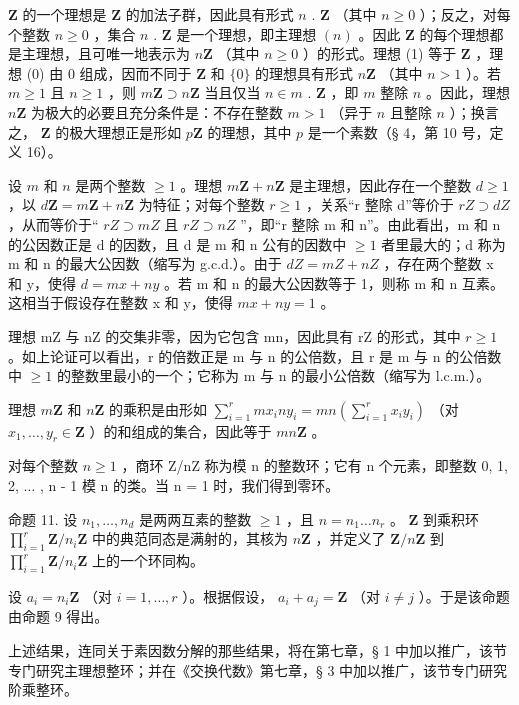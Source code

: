 
\(\mathbf{Z}\) 的一个理想是 \(\mathbf{Z}\) 的加法子群，因此具有形式 \(n\) . \(\mathbf{Z}\) （其中 \(n \geqslant 0\) ）；反之，对每个整数 \(n \geqslant 0\) ，集合 \(n\) . \(\mathbf{Z}\) 是一个理想，即主理想 \((n)\) 。因此 \(\mathbf{Z}\) 的每个理想都是主理想，且可唯一地表示为 \(n\mathbf{Z}\) （其中 \(n \geqslant 0\) ）的形式。理想 (1) 等于 \(\mathbf{Z}\) ，理想 (0) 由 0 组成，因而不同于 \(\mathbf{Z}\) 和 \(\{0\}\) 的理想具有形式 \(n\mathbf{Z}\) （其中 \(n > 1\) ）。若 \(m \geqslant 1\) 且 \(n \geqslant 1\) ，则 \(m\mathbf{Z} \supset n\mathbf{Z}\) 当且仅当 \(n \in m\) . \(\mathbf{Z}\) ，即 \(m\) 整除 \(n\) 。因此，理想 \(n\mathbf{Z}\) 为极大的必要且充分条件是：不存在整数 \(m > 1\) （异于 \(n\) 且整除 \(n\) ）；换言之， \(\mathbf{Z}\) 的极大理想正是形如 \(p\mathbf{Z}\) 的理想，其中 \(p\) 是一个素数（§ 4，第 10 号，定义 16）。

设 \(m\) 和 \(n\) 是两个整数 \(\geqslant 1\) 。理想 \(m\mathbf{Z} + n\mathbf{Z}\) 是主理想，因此存在一个整数 \(d \geqslant 1\) ，以 \(d\mathbf{Z} = m\mathbf{Z} + n\mathbf{Z}\) 为特征；对每个整数 \(r \geqslant 1\) ，关系“r 整除 d”等价于 \(rZ \supset dZ\) ，从而等价于“ \(rZ \supset mZ\) 且 \(rZ \supset nZ\) ”，即“r 整除 m 和 n”。由此看出，m 和 n 的公因数正是 d 的因数，且 d 是 m 和 n 公有的因数中 \(\geqslant 1\) 者里最大的；d 称为 m 和 n 的最大公因数（缩写为 g.c.d.）。由于 \(dZ = mZ + nZ\) ，存在两个整数 x 和 y，使得 \(d = mx + ny\) 。若 m 和 n 的最大公因数等于 1，则称 m 和 n 互素。这相当于假设存在整数 x 和 y，使得 \(mx + ny = 1\) 。

理想 mZ 与 nZ 的交集非零，因为它包含 mn，因此具有 rZ 的形式，其中 \(r \geqslant 1\) 。如上论证可以看出，r 的倍数正是 m 与 n 的公倍数，且 r 是 m 与 n 的公倍数中 \(\geqslant 1\) 的整数里最小的一个；它称为 m 与 n 的最小公倍数（缩写为 l.c.m.）。

理想 \(m\mathbf{Z}\) 和 \(n\mathbf{Z}\) 的乘积是由形如 \(\sum_{i=1}^{r} mx_i ny_i = mn\left(\sum_{i=1}^{r} x_i y_i\right)\) （对 \(x_1, \ldots, y_r \in \mathbf{Z}\) ）的和组成的集合，因此等于 \(mn\mathbf{Z}\) 。

对每个整数 \(n \geqslant 1\) ，商环 Z/nZ 称为模 n 的整数环；它有 n 个元素，即整数 0, 1, 2, \(\ldots\) , n - 1 模 n 的类。当 n = 1 时，我们得到零环。

命题 11. 设 \(n_1, \ldots, n_d\) 是两两互素的整数 \(\geqslant 1\) ，且 \(n = n_1 \ldots n_r\) 。 \(\mathbf{Z}\) 到乘积环 \(\prod_{i=1}^{r} \mathbf{Z} / n_i \mathbf{Z}\) 中的典范同态是满射的，其核为 \(n\mathbf{Z}\) ，并定义了 \(\mathbf{Z} / n\mathbf{Z}\) 到 \(\prod_{i=1}^{r} \mathbf{Z} / n_i \mathbf{Z}\) 上的一个环同构。

设 \(a_{i} = n_{i}\mathbf{Z}\) （对 \(i = 1, \ldots, r\) ）。根据假设， \(a_{i} + a_{j} = \mathbf{Z}\) （对 \(i \neq j\) ）。于是该命题由命题 9 得出。

上述结果，连同关于素因数分解的那些结果，将在第七章，§ 1 中加以推广，该节专门研究主理想整环；并在《交换代数》第七章，§ 3 中加以推广，该节专门研究阶乘整环。
